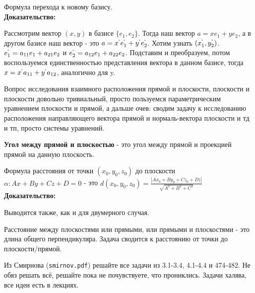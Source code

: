 \documentclass[12pt]{article}
\begin{document}
\begin{theorembox}
Формула перехода к новому базису.\\

\textbf{Доказательство:}

Рассмотрим вектор $(x, y)$ в базисе $\{e_1, e_2\}$. Тогда наш вектор $a = xe_1 + ye_2$, а в другом базисе наш вектор - это $a = x^`e^`_1 + y^`e^`_2$. Хотим узнать $(x^`_1, y^`_2)$. $e^`_1 = a_{11}e_1 + a_{21}e_2$ и $e^`_2 = a_{12}e_1 + a_{22}e_2$. Подставим и преобразуем, потом воспользуемся единственностью представления вектора в данном базисе, тогда $x = x^`a_{11} + y^`a_{12}$, аналогично для y.
\end{theorembox}

\begin{remarkbox}
Вопрос исследования взаимного расположения прямой и плоскости, плоскости и плоскости довольно тривиальный, просто пользуемся параметрическим уравнением плоскости и прямой, а дальше очев: сводим задачу к исследованию расположения направляющего вектора прямой и нормаль-вектора плоскости и тд и тп, просто системы уравнений.
\end{remarkbox}

\begin{definitionbox}
\textbf{Угол между прямой и плоскостью} - это угол между прямой и проекцией прямой на данную плоскость.
\end{definitionbox}

\begin{theorembox}
Формула расстояния от точки $(x_0, y_0, z_0)$ до плоскости $\alpha: Ax + By + Cz + D = 0$ - это $d(x_0, y_0, z_0) = \frac{|Ax_0 + By_0 + Cz_0 + D)|}{\sqrt{A^2 + B^2 + C^2}}$\\

\textbf{Доказательство:}

Выводится также, как и для двумерного случая.
\end{theorembox}

\begin{remarkbox}
Расстояние между плоскостями или прямыми, или прямыми и плоскостями - это длина общего перпендикуляра. Задача сводится к расстоянию от точки до плоскости/прямой.
\end{remarkbox}

\begin{homeworkbox}
    Из Смирнова (\texttt{smirnov.pdf}) решайте все задачи из 3.1-3.4, 4.1-4.4 и 474-482. Не обяз решать всё, решайте пока не почувствуете, что прониклись. Задачи халява, все идеи есть в лекциях.
\end{homeworkbox}
\end{document}
